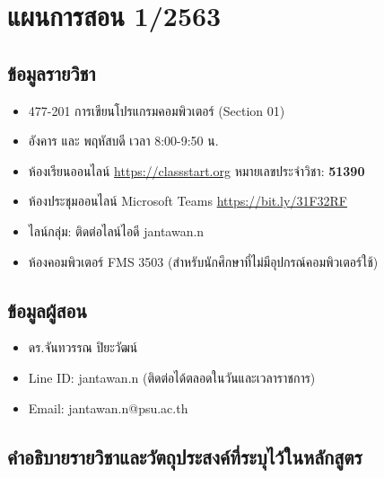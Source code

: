 \chapter{แผนการสอน 1/2563}

\section*{ข้อมูลรายวิชา}
\begin{tcolorbox}[breakable,enhanced,fonttitle=\bfseries,colback=myblue!05,colframe=myblue]
\begin{itemize}
\item 477-201 การเขียนโปรแกรมคอมพิวเตอร์ (Section 01)
\item อังคาร และ พฤหัสบดี เวลา 8:00-9:50 น.
\item ห้องเรียนออนไลน์ \url{https://classstart.org} หมายเลขประจำวิชา: \textbf{51390}
\item ห้องประชุมออนไลน์ Microsoft Teams \url{https://bit.ly/31F32RF}
\item ไลน์กลุ่ม: ติดต่อไลน์ไอดี jantawan.n
\item ห้องคอมพิวเตอร์ FMS 3503 (สำหรับนักศึกษาที่ไม่มีอุปกรณ์คอมพิวเตอร์ใช้)
\end{itemize}
\end{tcolorbox}

\section*{ข้อมูลผู้สอน}
\begin{tcolorbox}[breakable,enhanced,fonttitle=\bfseries,colback=myblue!05,colframe=myblue]
\begin{itemize}
\item ดร.จันทวรรณ ปิยะวัฒน์
\item Line ID: jantawan.n (ติดต่อได้ตลอดในวันและเวลาราชการ)
\item Email: jantawan.n@psu.ac.th
\end{itemize}
\end{tcolorbox}

\section*{คำอธิบายรายวิชาและวัตถุประสงค์ที่ระบุไว้ในหลักสูตร}


